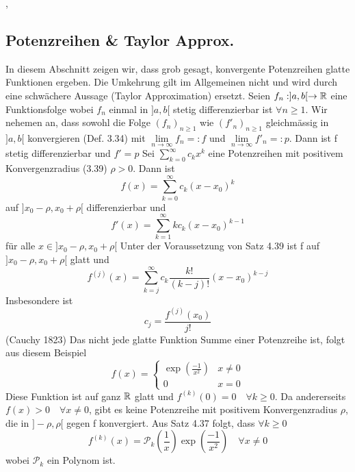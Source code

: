 \sep
\subsection{Potenzreihen \& Taylor Approx.}
In diesem Abschnitt zeigen wir, dass grob gesagt, konvergente Potenzreihen glatte Funktionen ergeben. Die Umkehrung gilt im Allgemeinen nicht und wird durch eine schwächere Aussage (Taylor Approximation) ersetzt. \newline
\Satz[4.39] Seien  \(f_n: ]a,b[ \rightarrow \mathbb{R} \) eine Funktionsfolge wobei \(f_n\) einmal in \(]a,b[\) stetig differenzierbar ist \( \forall n \geq 1\). Wir nehemen an, dass sowohl die Folge \((f_n)_{n \geq 1}\) wie \((f'_n)_{n \geq 1}\) gleichmässig in \(]a,b[\) konvergieren (Def. 3.34) mit \(\lim\limits_{n \rightarrow \infty} f_n =: f \) und \(\lim\limits_{n \rightarrow \infty} f'_n =: p \). \newline
Dann ist f stetig differenzierbar und \(f' = p\) \newline
\Satz[4.40] Sei \(\sum_{k=0}^\infty c_kx^k\) eine Potenzreihen mit positivem Konvergenzradius (3.39) \(\rho > 0\). Dann ist
\[f(x) = \sum_{k=0}^\infty c_k(x - x_0)^k\]
auf \(] x_0 - \rho, x_0 + \rho [\) differenzierbar und
\[f'(x) = \sum_{k=1}^\infty kc_k(x - x_0)^{k-1}\]
für alle \( x \in ]x_0 - \rho , x_0 + \rho [\) \newline
\Korollar[4.41] Unter der Voraussetzung von Satz 4.39 ist f auf \(] x_0 - \rho, x_0 + \rho[ \) glatt und
\[f^{(j)}(x) = \sum_{k=j}^\infty c_k \frac{k!}{(k-j)!}(x - x_0)^{k-j}\]
Insbesondere ist
\[c_j = \frac{f^{(j)}(x_0)}{j!}\]
\Bsp[4.42](Cauchy 1823)\newline
Das nicht jede glatte Funktion Summe einer Potenzreihe ist, folgt aus diesem Beispiel
\[f(x)=\left\{\begin{array}{cc}
\exp \left(\frac{-1}{x^{2}}\right) & x \neq 0 \\
0 & x=0
\end{array}\right. \]
Diese Funktion ist auf ganz \( \mathbb{R} \) glatt und \newline \( f^{(k)}(0) = 0 \quad \forall k \geq 0\).
Da andererseits  \newline \( f(x) > 0 \quad \forall x \neq 0\), gibt es keine Potenzreihe mit positivem Konvergenzradius \( \rho \), die in \( ]-\rho, \rho [\) gegen f konvergiert. \newline
Aus Satz 4.37 folgt, dass \( \forall k \geq 0\)
\[ f^{(k)}(x) = \mathcal{P}_k \left( \frac{1}{x}\right) \exp \left( \frac{-1}{x^2}\right) \quad \forall x \neq 0\]
wobei \( \mathcal{P}_k\) ein Polynom ist.
